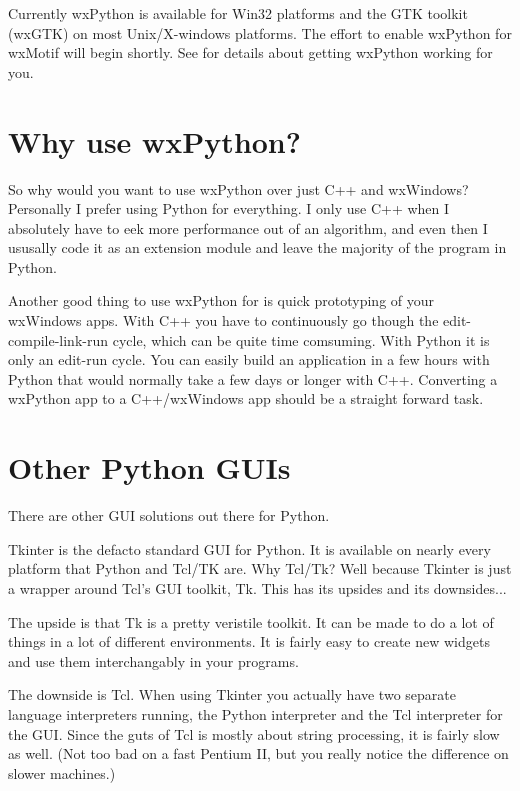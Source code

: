 Currently wxPython is available for Win32 platforms and the GTK
toolkit (wxGTK) on most Unix/X-windows platforms.  The effort to
enable wxPython for wxMotif will begin shortly.  See  for
details about getting wxPython working for you.


\section{Why use wxPython?}\label{wxpwhy}

So why would you want to use wxPython over just C++ and wxWindows?
Personally I prefer using Python for everything. I only use C++ when
I absolutely have to eek more performance out of an algorithm, and even
then I ususally code it as an extension module and leave the majority
of the program in Python.

Another good thing to use wxPython for is quick prototyping of your
wxWindows apps.  With C++ you have to continuously go though the
edit-compile-link-run cycle, which can be quite time comsuming.  With
Python it is only an edit-run cycle.  You can easily build an
application in a few hours with Python that would normally take a few
days or longer with C++.  Converting a wxPython app to a C++/wxWindows app
should be a straight forward task.

\section{Other Python GUIs}\label{wxpother}

There are other GUI solutions out there for Python.


Tkinter is the defacto standard GUI for Python.  It is available
on nearly every platform that Python and Tcl/TK are.  Why Tcl/Tk?
Well because Tkinter is just a wrapper around Tcl's GUI toolkit, Tk.
This has its upsides and its downsides...

The upside is that Tk is a pretty veristile toolkit.  It can be made
to do a lot of things in a lot of different environments.  It is fairly
easy to create new widgets and use them interchangably in your
programs.

The downside is Tcl.  When using Tkinter you actually have two
separate language interpreters running, the Python interpreter and the
Tcl interpreter for the GUI.  Since the guts of Tcl is mostly about
string processing, it is fairly slow as well.  (Not too bad on a fast
Pentium II, but you really notice the difference on slower machines.)

